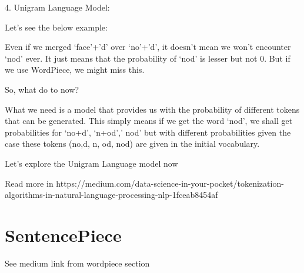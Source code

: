 4. Unigram Language Model:

Let’s see the below example:

Even if we merged ‘face’+’d’ over ‘no’+’d’, it doesn’t mean we won’t encounter ‘nod’ ever. It just means that the probability of ‘nod’ is lesser but not 0. But if we use WordPiece, we might miss this.

So, what do to now?

What we need is a model that provides us with the probability of different tokens that can be generated. This simply means if we get the word ‘nod’, we shall get probabilities for ‘no+d’, ‘n+od’,’ nod’ but with different probabilities given the case these tokens (no,d, n, od, nod) are given in the initial vocabulary.

Let’s explore the Unigram Language model now

Read more in https://medium.com/data-science-in-your-pocket/tokenization-algorithms-in-natural-language-processing-nlp-1fceab8454af

\section{{SentencePiece}}

See medium link from wordpiece section

